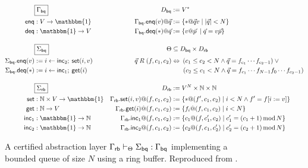 \documentclass[acmsmall,review,anonymous]{acmart}\settopmatter{printfolios=true,printccs=false,printacmref=false}
\begin{document}
\begin{figure*} %
  \begin{minipage}{.9\textwidth}
    \begin{align*}
      & \fbox{$\Gamma_\kw{bq}$} &
        D_\kw{bq} &:= V^* \\
      \kw{enq} &: V \rightarrow \mathbbm{1} &
        \Gamma_\kw{bq}.\kw{enq}(v)@\vec{q} &:= \{ * @ \vec{q} v \mid |\vec{q}| < N \} \\
      \kw{deq} &: \mathbbm{1} \rightarrow V &
        \Gamma_\kw{bq}.\kw{deq}(*)@\vec{q} &:= \{ v @ \vec{p} \: \mid \vec{q} = v \vec{p} \}
      \\[1em]
      & \fbox{$\Sigma_\kw{bq}$} &
        \Theta &\subseteq D_\kw{bq} \times D_\kw{rb} \\
      \Sigma_\kw{bq}.\kw{enq}(v) &:= i \leftarrow \kw{inc}_2 ; \: \kw{set}(i, v) &
        \vec{q} \mathrel{R} (f, c_1, c_2) &\Leftrightarrow
        \: (c_1 \le c_2 < N \wedge
            \vec{q} = f_{c_1} \cdots f_{c_2-1}) \vee {}
      \\
      \Sigma_\kw{bq}.\kw{deq}(*) &:= i \leftarrow \kw{inc}_1 ; \: \kw{get}(i) &
        & \qquad \! (c_2 \le c_1 < N \wedge
            \vec{q} = f_{c_1} \cdots f_{N-1} f_0 \cdots f_{c_2 - 1})
      \\[1em]
      & \fbox{$\Sigma_\kw{rb}$} &
        D_\kw{rb} &:= V^N \times \mathbb{N} \times \mathbb{N}
      \\
      \kw{set} &: \mathbb{N} \times V \rightarrow \mathbbm{1} &
        \Gamma_\kw{rb}.\kw{set}(i, v)@(f, c_1, c_2) &:=
        \{ *@(f', c_1, c_2) \mid i < N \wedge f' = f[i := v] \}
      \\
      \kw{get} &: \mathbb{N} \rightarrow V &
        \Gamma_\kw{rb}.\kw{get}(i)@(f, c_1, c_2) &:=
        \{ f_i@(f, c_1, c_2) \mid i < N \}
      \\
      \kw{inc}_1 &: \mathbbm{1} \rightarrow \mathbb{N} &
        \Gamma_\kw{rb}.\kw{inc}_1@(f, c_1, c_2) &:=
        \{ c_1@(f, c_1', c_2) \mid
           c_1' = (c_1 + 1) \mathop{\mathrm{mod}} N \}
      \\
      \kw{inc}_2 &: \mathbbm{1} \rightarrow \mathbb{N} &
        \Gamma_\kw{rb}.\kw{inc}_2@(f, c_1, c_2) &:=
        \{ c_2@(f, c_1, c_2') \mid
           c_2' = (c_2 + 1) \mathop{\mathrm{mod}} N \}
    \end{align*}
  \end{minipage}
  \caption{
    A certified abstraction layer
    $\Gamma_{ \mathsf{rb} } \vdash_\Theta \Sigma_{ \mathsf{bq} } : \Gamma_{ \mathsf{bq} }$
    implementing a bounded queue of size $N$
    using a ring buffer.
    Reproduced from \citet{rbgs-cal}.}
  \label{fig:cal}
\end{figure*}
\end{document}
